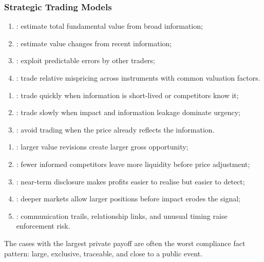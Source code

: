 \subsubsection{Strategic Trading Models}

\begin{taxonomy} 
\begin{enumerate}[label=\roman*.]
\setlength{\itemsep}{0pt}
\item {}: estimate total fundamental value from broad information;
\item {}: estimate value changes from recent information;
\item {}: exploit predictable errors by other traders;
\item {}: trade relative mispricing across instruments with common valuation factors.
\end{enumerate}
\end{taxonomy}

\begin{taxonomy} 
\begin{enumerate}[label=\roman*.]
\setlength{\itemsep}{0pt}
\item {}: trade quickly when information is short-lived or competitors know it;
\item {}: trade slowly when impact and information leakage dominate urgency;
\item {}: avoid trading when the price already reflects the information.
\end{enumerate}
\end{taxonomy}

\begin{taxonomy} 
\begin{enumerate}[label=\roman*.]
\setlength{\itemsep}{0pt}
\item {}: larger value revisions create larger gross opportunity;
\item {}: fewer informed competitors leave more liquidity before price adjustment;
\item {}: near-term disclosure makes profits easier to realise but easier to detect;
\item {}: deeper markets allow larger positions before impact erodes the signal;
\item {}: communication trails, relationship links, and unusual timing raise enforcement risk.
\end{enumerate}
The cases with the largest private payoff are often the worst compliance fact pattern: large, exclusive, traceable, and close to a public event.
\end{taxonomy}

